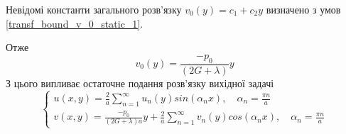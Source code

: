 Невідомі константи загального розв'язку $v_0(y) = c_1 + c_2 y$ визначено з умов \eqref{transf_bound_v_0_static_1}.

Отже 
\begin{equation}
    v_0(y) = \frac{-p_0}{(2G + \lambda)}y
\end{equation}
З цього випливає остаточне подання розв'язку вихідної задачі
\begin{equation}
    \begin{cases}
        u(x,y) = \frac{2}{a} \sum_{n=1}^{\infty} u_n(y) sin(\alpha_n x), \quad \alpha_n = \frac{\pi n}{a} \\
        v(x,y) = \frac{-p_0}{(2G + \lambda)a}y + \frac{2}{a} \sum_{n=1}^{\infty} v_n(y) cos(\alpha_n x), \quad \alpha_n = \frac{\pi n}{a}
    \end{cases}
\end{equation}


